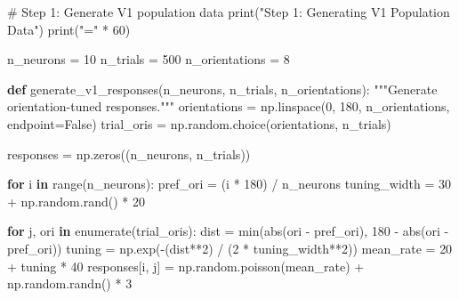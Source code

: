\documentclass[
  11pt,
  letterpaper,
  oneside,
  openany]{book}
\newenvironment{Shaded}{\begin{snugshade}}{\end{snugshade}}
\newcommand{\BuiltInTok}[1]{\textcolor[rgb]{0.00,0.23,0.31}{#1}}
\newcommand{\CommentTok}[1]{\textcolor[rgb]{0.37,0.37,0.37}{#1}}
\newcommand{\ControlFlowTok}[1]{\textcolor[rgb]{0.00,0.23,0.31}{\textbf{#1}}}
\newcommand{\DecValTok}[1]{\textcolor[rgb]{0.68,0.00,0.00}{#1}}
\newcommand{\KeywordTok}[1]{\textcolor[rgb]{0.00,0.23,0.31}{\textbf{#1}}}
\newcommand{\NormalTok}[1]{\textcolor[rgb]{0.00,0.23,0.31}{#1}}
\newcommand{\OperatorTok}[1]{\textcolor[rgb]{0.37,0.37,0.37}{#1}}
\newcommand{\StringTok}[1]{\textcolor[rgb]{0.13,0.47,0.30}{#1}}
\newcommand{\VariableTok}[1]{\textcolor[rgb]{0.07,0.07,0.07}{#1}}
\begin{document}
\begin{Shaded}
\begin{Highlighting}[]
\CommentTok{\# Step 1: Generate V1 population data}
\BuiltInTok{print}\NormalTok{(}\StringTok{"Step 1: Generating V1 Population Data"}\NormalTok{)}
\BuiltInTok{print}\NormalTok{(}\StringTok{"="} \OperatorTok{*} \DecValTok{60}\NormalTok{)}

\NormalTok{n\_neurons }\OperatorTok{=} \DecValTok{10}
\NormalTok{n\_trials }\OperatorTok{=} \DecValTok{500}
\NormalTok{n\_orientations }\OperatorTok{=} \DecValTok{8}

\KeywordTok{def}\NormalTok{ generate\_v1\_responses(n\_neurons, n\_trials, n\_orientations):}
    \CommentTok{"""Generate orientation{-}tuned responses."""}
\NormalTok{    orientations }\OperatorTok{=}\NormalTok{ np.linspace(}\DecValTok{0}\NormalTok{, }\DecValTok{180}\NormalTok{, n\_orientations, endpoint}\OperatorTok{=}\VariableTok{False}\NormalTok{)}
\NormalTok{    trial\_oris }\OperatorTok{=}\NormalTok{ np.random.choice(orientations, n\_trials)}
    
\NormalTok{    responses }\OperatorTok{=}\NormalTok{ np.zeros((n\_neurons, n\_trials))}
    
    \ControlFlowTok{for}\NormalTok{ i }\KeywordTok{in} \BuiltInTok{range}\NormalTok{(n\_neurons):}
\NormalTok{        pref\_ori }\OperatorTok{=}\NormalTok{ (i }\OperatorTok{*} \DecValTok{180}\NormalTok{) }\OperatorTok{/}\NormalTok{ n\_neurons}
\NormalTok{        tuning\_width }\OperatorTok{=} \DecValTok{30} \OperatorTok{+}\NormalTok{ np.random.rand() }\OperatorTok{*} \DecValTok{20}
        
        \ControlFlowTok{for}\NormalTok{ j, ori }\KeywordTok{in} \BuiltInTok{enumerate}\NormalTok{(trial\_oris):}
\NormalTok{            dist }\OperatorTok{=} \BuiltInTok{min}\NormalTok{(}\BuiltInTok{abs}\NormalTok{(ori }\OperatorTok{{-}}\NormalTok{ pref\_ori), }\DecValTok{180} \OperatorTok{{-}} \BuiltInTok{abs}\NormalTok{(ori }\OperatorTok{{-}}\NormalTok{ pref\_ori))}
\NormalTok{            tuning }\OperatorTok{=}\NormalTok{ np.exp(}\OperatorTok{{-}}\NormalTok{(dist}\OperatorTok{**}\DecValTok{2}\NormalTok{) }\OperatorTok{/}\NormalTok{ (}\DecValTok{2} \OperatorTok{*}\NormalTok{ tuning\_width}\OperatorTok{**}\DecValTok{2}\NormalTok{))}
\NormalTok{            mean\_rate }\OperatorTok{=} \DecValTok{20} \OperatorTok{+}\NormalTok{ tuning }\OperatorTok{*} \DecValTok{40}
\NormalTok{            responses[i, j] }\OperatorTok{=}\NormalTok{ np.random.poisson(mean\_rate) }\OperatorTok{+}\NormalTok{ np.random.randn() }\OperatorTok{*} \DecValTok{3}
    

\end{Highlighting}
\end{Shaded}
\end{document}
